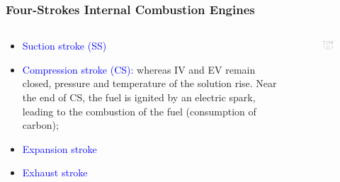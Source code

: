 \documentclass[10pt,compress]{beamer}
\begin{document}
\begin{frame}
 \frametitle{Four-Strokes Internal Combustion Engines}
  \begin{columns}
   \begin{column}[c]{0.4\linewidth}
    \begin{itemize}
     \item <1-> \textcolor{blue}{Suction stroke (SS)} 
     \item <1-> \textcolor{blue}{Compression stroke (CS):} whereas IV and EV remain closed, pressure and temperature of the solution rise. Near the end of CS, the fuel is ignited by an electric spark, leading to the combustion of the fuel (consumption of carbon);
     \item <2-> \textcolor{blue}{Expansion stroke} 
     \item <2-> \textcolor{blue}{Exhaust stroke} 
    \end{itemize}
   \end{column}
   \begin{column}[c]{0.6\linewidth}
    \begin{figure}%
     \begin{center}
      \includegraphics[width=7.5cm,clip]{./Pics/InternalCombustion_4Strokes_Otto}
     \end{center}
    \end{figure}  
   \end{column}  
  \end{columns}
\end{frame}
\end{document}
